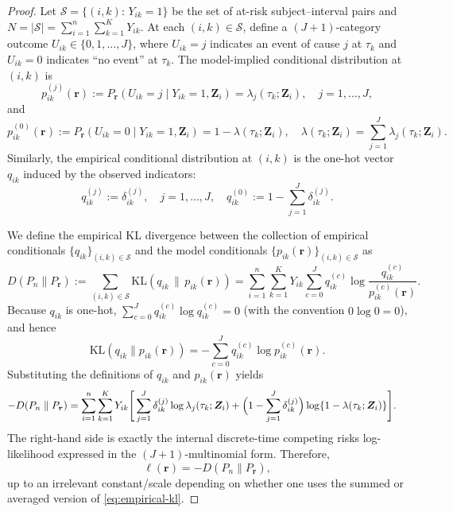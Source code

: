\documentclass{article}
\theoremstyle{plain}
\theoremstyle{definition}
\theoremstyle{remark}
\begin{document}
\begin{proof}
Let $\mathcal S=\{(i,k):\,Y_{ik}=1\}$ be the set of at-risk subject--interval pairs and
$N=\lvert \mathcal S\rvert=\sum_{i=1}^n\sum_{k=1}^K Y_{ik}$.
At each $(i,k)\in\mathcal S$, define a $(J+1)$-category outcome
$U_{ik}\in\{0,1,\ldots,J\}$, where $U_{ik}=j$ indicates an event of cause $j$ at $\tau_k$
and $U_{ik}=0$ indicates ``no event'' at $\tau_k$.
The model-implied conditional distribution at $(i,k)$ is
\[
p_{ik}^{(j)}(\bm r)
:=P_{\bm r}(U_{ik}=j\mid Y_{ik}=1,\bm Z_i)=\lambda_j(\tau_k;\bm Z_i),\quad j=1,\ldots,J,
\]
and
\[
p_{ik}^{(0)}(\bm r)
:=P_{\bm r}(U_{ik}=0\mid Y_{ik}=1,\bm Z_i)=1-\lambda(\tau_k;\bm Z_i),
\quad \lambda(\tau_k;\bm Z_i)=\sum_{j=1}^J\lambda_j(\tau_k;\bm Z_i).
\]
Similarly, the empirical conditional distribution at $(i,k)$ is the one-hot vector
$q_{ik}$ induced by the observed indicators:
\[
q_{ik}^{(j)}:=\delta_{ik}^{(j)},\quad j=1,\ldots,J,
\quad
q_{ik}^{(0)}:=1-\sum_{j=1}^J\delta_{ik}^{(j)}.
\]

We define the empirical KL divergence between the collection of empirical conditionals
$\{q_{ik}\}_{(i,k)\in\mathcal S}$ and the model conditionals
$\{p_{ik}(\bm r)\}_{(i,k)\in\mathcal S}$ as
\begin{equation}
D(P_n\parallel P_{\bm r})
:=
\sum_{(i,k)\in\mathcal S}
\mathrm{KL}\!\left(q_{ik}\,\|\,p_{ik}(\bm r)\right)
=
\sum_{i=1}^n\sum_{k=1}^K Y_{ik}
\sum_{c=0}^J q_{ik}^{(c)}
\log\frac{q_{ik}^{(c)}}{p_{ik}^{(c)}(\bm r)}.
\label{eq:empirical-kl}
\end{equation}
Because $q_{ik}$ is one-hot, $\sum_{c=0}^J q_{ik}^{(c)}\log q_{ik}^{(c)}=0$ (with the convention
$0\log 0=0$), and hence
\[
\mathrm{KL}(q_{ik}\|p_{ik}(\bm r))
=
-\sum_{c=0}^J q_{ik}^{(c)}\log p_{ik}^{(c)}(\bm r).
\]
Substituting the definitions of $q_{ik}$ and $p_{ik}(\bm r)$ yields
\begin{align}
-D(P_n\parallel P_{\bm r})
&=
\sum_{i=1}^n\sum_{k=1}^K Y_{ik}
\Bigg[
\sum_{j=1}^J \delta_{ik}^{(j)}\log \lambda_j(\tau_k;\bm Z_i)
+
\Bigl(1-\sum_{j=1}^J\delta_{ik}^{(j)}\Bigr)\log\{1-\lambda(\tau_k;\bm Z_i)\}
\Bigg].
\label{eq:ll-as-negkl}
\end{align}
The right-hand side is exactly the internal discrete-time competing risks log-likelihood
expressed in the $(J+1)$-multinomial form. Therefore,
\begin{equation}
\ell(\bm r) = -D(P_n\parallel P_{\bm r}),
\label{eq:ell-negkl}
\end{equation}
up to an irrelevant constant/scale depending on whether one uses the summed or averaged
version of \eqref{eq:empirical-kl}.


\end{proof}
\end{document}
